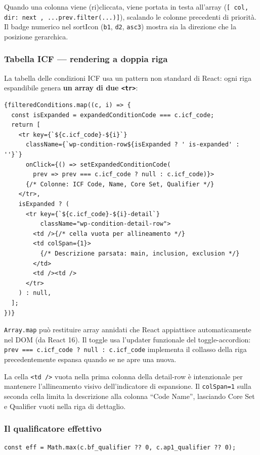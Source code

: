 \documentclass[a4paper,12pt]{article}
\begin{document}
Quando una colonna viene (ri)cliccata, viene portata in testa all'array
(\texttt{[{ col, dir: next }, ...prev.filter(...)]}), scalando le
colonne precedenti di priorit\`{a}. Il badge numerico nel sortIcon
(\texttt{b1}, \texttt{d2}, \texttt{asc3}) mostra sia la direzione
che la posizione gerarchica.

\subsubsection{Tabella ICF --- rendering a doppia riga}

La tabella delle condizioni ICF usa un pattern non standard di React:
ogni riga espandibile genera \textbf{un array di due \texttt{<tr>}}:

\begin{lstlisting}
{filteredConditions.map((c, i) => {
  const isExpanded = expandedConditionCode === c.icf_code;
  return [
    <tr key={`${c.icf_code}-${i}`}
      className={`wp-condition-row${isExpanded ? ' is-expanded' : ''}`}
      onClick={() => setExpandedConditionCode(
        prev => prev === c.icf_code ? null : c.icf_code)}>
      {/* Colonne: ICF Code, Name, Core Set, Qualifier */}
    </tr>,
    isExpanded ? (
      <tr key={`${c.icf_code}-${i}-detail`}
          className="wp-condition-detail-row">
        <td />{/* cella vuota per allineamento */}
        <td colSpan={1}>
          {/* Descrizione parsata: main, inclusion, exclusion */}
        </td>
        <td /><td />
      </tr>
    ) : null,
  ];
})}
\end{lstlisting}

\noindent \texttt{Array.map} pu\`{o} restituire array annidati che React appiattisce
automaticamente nel DOM (da React 16). Il toggle usa l'updater
funzionale del toggle-accordion: \texttt{prev === c.icf\_\allowbreak{}code ? null : c.icf\_\allowbreak{}code}
implementa il collasso della riga precedentemente espansa quando se
ne apre una nuova.

La cella \texttt{<td />} vuota nella prima colonna della detail-row
\`{e} intenzionale per mantenere l'allineamento visivo dell'indicatore
di espansione. Il \texttt{colSpan={1}} sulla seconda cella limita la
descrizione alla colonna ``Code Name'', lasciando Core Set e Qualifier
vuoti nella riga di dettaglio.

\subsubsection{Il qualificatore effettivo}
\vspace{2pt}
\begin{lstlisting}
const eff = Math.max(c.bf_qualifier ?? 0, c.ap1_qualifier ?? 0);
\end{lstlisting}
\end{document}
